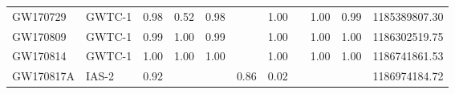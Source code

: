 \begin{table*}
\begin{NiceTabular}{@{}ll!{\quad}|c|cc!{\quad}c!{\quad}c!{\quad}ccc!{\quad}|c@{}}
  GW170729 &  GWTC-1 &        0.98 &              0.52 &               0.98 &             &         1.00 &              &           1.00 &             0.99 & 1185389807.30 \\
  GW170809 &  GWTC-1 &        0.99 &              1.00 &               0.99 &             &         1.00 &              &           1.00 &             1.00 & 1186302519.75 \\
  GW170814 &  GWTC-1 &        1.00 &              1.00 &               1.00 &             &         1.00 &              &           1.00 &             1.00 & 1186741861.53 \\
 GW170817A &   IAS-2 &        0.92 &                   &                    &        0.86 &         0.02 &              &                &                  & 1186974184.72 \\

\end{NiceTabular}
\end{table*}
